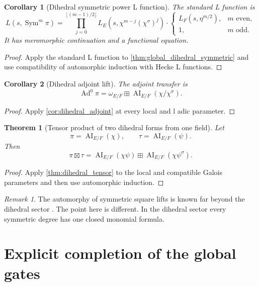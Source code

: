 \documentclass{aomart}
\newtheorem{theorem}{Theorem}[section]
\newtheorem{corollary}[corollary]{Corollary}
\theoremstyle{definition}
\theoremstyle{remark}
\newtheorem{remark}[remark]{Remark}
\newcommand{\AI}{\operatorname{AI}}
\newcommand{\Sym}{\operatorname{Sym}}
\newcommand{\Ad}{\operatorname{Ad}}
\newcommand{\boxplusop}{\mathbin{\boxplus}}
\begin{document}
\begin{corollary}[Dihedral symmetric power L function]\label{cor:global_dihedral_L}
The standard L function is
\[
\boxed{
L(s,\Sym^m\pi)
=
\prod_{j=0}^{\lfloor(m-1)/2\rfloor}
L_E
\left(
 s,
 \chi^{m-j}(\chi^\sigma)^j
\right)
\mathbin{\cdot}
\begin{cases}
L_F(s,\eta^{m/2}),&m\text{ even},\\
1,&m\text{ odd}.
\end{cases}
}
\]
It has meromorphic continuation and a functional equation.
\end{corollary}

\begin{proof}
Apply the standard L function to \cref{thm:global_dihedral_symmetric} and use compatibility of automorphic induction with Hecke L functions.
\end{proof}

\begin{corollary}[Dihedral adjoint lift]\label{cor:global_dihedral_adjoint}
The adjoint transfer is
\[
\boxed{
\Ad^0\pi
=
\omega_{E/F}
\boxplusop
\AI_{E/F}
\left(
\chi/\chi^\sigma
\right).
}
\]
\end{corollary}

\begin{proof}
Apply \cref{cor:dihedral_adjoint} at every local and l adic parameter.
\end{proof}

\begin{theorem}[Tensor product of two dihedral forms from one field]\label{thm:global_dihedral_tensor}
Let
\[
\pi=\AI_{E/F}(\chi),
\qquad
\tau=\AI_{E/F}(\psi).
\]
Then
\[
\boxed{
\pi\boxtimes\tau
=
\AI_{E/F}(\chi\psi)
\boxplusop
\AI_{E/F}(\chi\psi^\sigma).
}
\]
\end{theorem}

\begin{proof}
Apply \cref{thm:dihedral_tensor} to the local and compatible Galois parameters and then use automorphic induction.
\end{proof}

\begin{remark}\label{rem:dihedral_general_context}
The automorphy of symmetric square lifts is known far beyond the dihedral sector \cite{GelbartJacquet1978}. The point here is different. In the dihedral sector every symmetric degree has one closed monomial formula.
\end{remark}

\section{Explicit completion of the global gates}\label{sec:gates}
\end{document}
